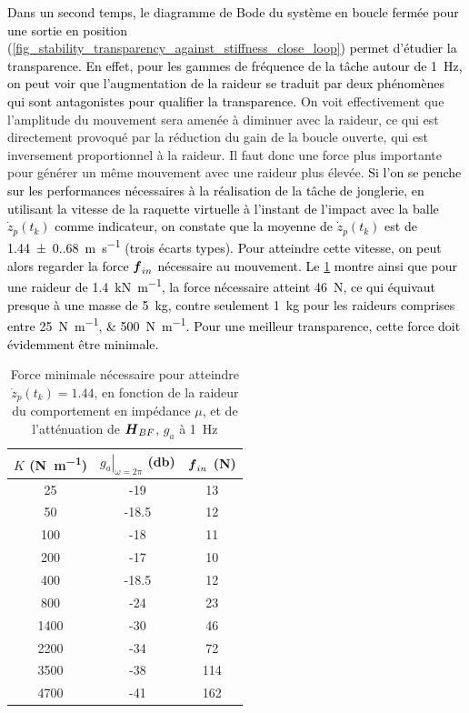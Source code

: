 \textcolor{black}{Dans un second temps, le diagramme de Bode du système en boucle fermée pour une sortie en position (\cref{fig_stability_transparency_against_stiffness_close_loop}) permet d'étudier la transparence. En effet, pour les gammes de fréquence de la tâche autour de \SI{1}{\hertz}, on peut voir que l'augmentation de la raideur se traduit par deux phénomènes qui sont antagonistes pour qualifier la transparence.} %
%
On voit effectivement que l'amplitude du mouvement sera amenée à diminuer avec la raideur, ce qui est directement provoqué par la réduction du gain de la boucle ouverte, qui est inversement proportionnel à la raideur. Il faut donc une force plus importante pour générer un même mouvement avec une raideur plus élevée. %
%
\textcolor{black}{Si l'on se penche sur les performances nécessaires à la réalisation de la tâche de jonglerie, en utilisant la vitesse de la raquette virtuelle à l'instant de l'impact avec la balle $\dot{z}_p(t_k)$ comme indicateur, on constate que la moyenne de $\dot{z}_p(t_k)$ est de \SI{1.44(0.68)}{\meter\per\second} (trois écarts types). Pour atteindre cette vitesse, on peut alors regarder la force $\vect{f}_{in}$ nécessaire au mouvement. Le \cref{tab_gain_attenuation_velocity} montre ainsi que pour une raideur de \SI{1.4}{\kilo\newton\per\meter}, la force nécessaire atteint \SI{46}{\newton}, ce qui équivaut presque à une masse de \SI{5}{\kilogram}, contre seulement \SI{1}{\kilogram} pour les raideurs comprises entre \SIlist{25;500}{\newton\per\meter}. Pour une meilleur transparence, cette force doit évidemment être minimale.}
	

\begin{table}
	\centering
	\begin{tabular}{| c | c | c |}
		\hline%
		$K$ (\si{\newton\per\meter}) & $\left.g_a\right|_{\omega=2\pi}$ (\si{\decibel})& $\vect{f}_{in}$ (\si{\newton})\\\hline%
		25 & -19 & 13\\
		50 & -18.5 & 12\\
		100 & -18 & 11\\
		200 & -17 & 10\\
		400 & -18.5 & 12\\
		800 & -24 & 23\\
		1400 & -30 & 46\\
		2200 & -34 & 72\\
		3500 & -38 & 114\\
		4700 & -41 & 162\\
		\hline
	\end{tabular}
	\caption[Force minimale nécessaire pour la tâche, en fonction de la raideur de l'environnement]{Force minimale nécessaire pour atteindre $\dot{z}_p(t_k)=1.44$, en fonction de la raideur du comportement en impédance $\mu$, et de l'atténuation de $\matr{H}_{BF}$, $g_a$ à \SI{1}{\hertz}}
	\label{tab_gain_attenuation_velocity}
\end{table}

